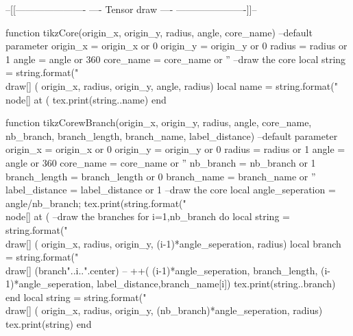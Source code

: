 \begin{luacode*}
	--[[----------------------
	----    Tensor draw   ----
	----------------------]]--
  
	function tikzCore(origin_x, origin_y, radius, angle, core_name)
		--default parameter
		origin_x = origin_x or 0
		origin_y = origin_y or 0
		radius = radius or 1
		angle = angle or 360
		core_name = core_name or ''
		--draw the core
		local string = string.format("\\draw[] (%
		origin_x, radius, origin_y, angle, radius)
		local name = string.format("\\node[] at (%
		tex.print(string..name)
	end
  
	function tikzCorewBranch(origin_x, origin_y, radius, angle, core_name, nb_branch, branch_length, branch_name, label_distance)
		--default parameter
		origin_x = origin_x or 0
		origin_y = origin_y or 0
		radius = radius or 1
		angle = angle or 360
		core_name = core_name or ''
		nb_branch = nb_branch or 1
		branch_length = branch_length or 0
		branch_name = branch_name or ''
		label_distance = label_distance or 1
		--draw the core
		local angle_seperation = angle/nb_branch;
		tex.print(string.format("\\node[] at (%
		--draw the branches
		for i=1,nb_branch do
			local string = string.format("\\draw[] (%
			origin_x, radius, origin_y, (i-1)*angle_seperation, radius)
			local branch = string.format("\\draw[] (branch"..i..".center) -- ++(%
			(i-1)*angle_seperation, branch_length, (i-1)*angle_seperation, label_distance,branch_name[i])
			tex.print(string..branch)
		end
		local string = string.format("\\draw[] (%
		origin_x, radius, origin_y, (nb_branch)*angle_seperation, radius)
		tex.print(string)
	end
  

\end{luacode*}
